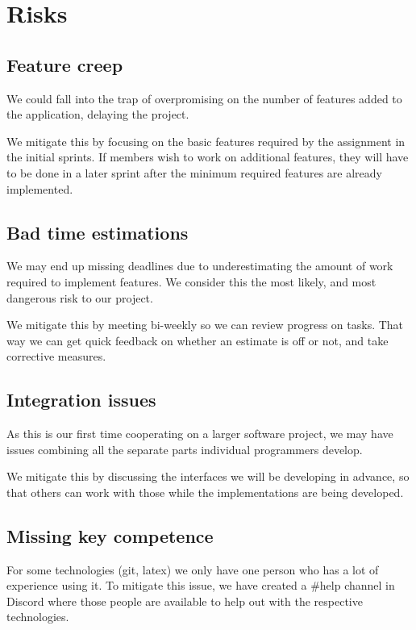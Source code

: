\documentclass{article}
\begin{document}
\section*{Risks}

\subsection*{Feature creep}

We could fall into the trap of overpromising on the number of features added to the application, delaying the project.

We mitigate this by focusing on the basic features required by the assignment in the initial sprints. If members wish to work on additional features, they will have to be done in a later sprint after the minimum required features are already implemented.

\subsection*{Bad time estimations}

We may end up missing deadlines due to underestimating the amount of work required to implement features. We consider this the most likely, and most dangerous risk to our project.

We mitigate this by meeting bi-weekly so we can review progress on tasks. That way we can get quick feedback on whether an estimate is off or not, and take corrective measures.

\subsection*{Integration issues}

As this is our first time cooperating on a larger software project, we may have issues combining all the separate parts individual programmers develop.

We mitigate this by discussing the interfaces we will be developing in advance, so that others can work with those while the implementations are being developed.

\subsection*{Missing key competence}

For some technologies (git, latex) we only have one person who has a lot of experience using it. To mitigate this issue, we have created a \#help channel in Discord where those people are available to help out with the respective technologies.
\end{document}
